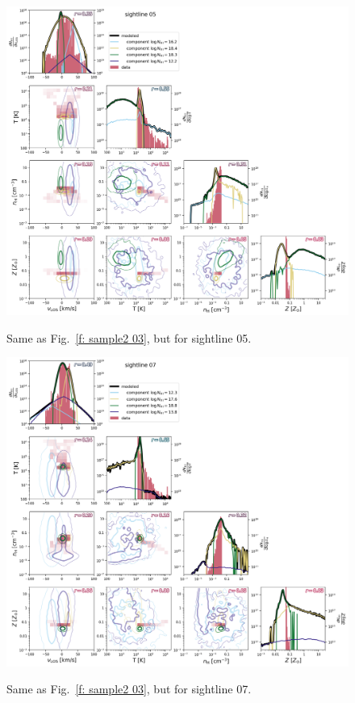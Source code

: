 \documentclass[fleqn,usenatbib]{mnras}
\begin{document}
\begin{figure}
    \centering
    \includegraphics[width=\textwidth]{figures/sample2/sightline_0005.png}
    \label{f: sample2 05}
    \caption{Same as Fig.~\ref{f: sample2 03}, but for sightline 05.}
\end{figure}

\begin{figure}
    \centering
    \includegraphics[width=\textwidth]{figures/sample2/sightline_0007.png}
    \label{f: sample2 07}
    \caption{Same as Fig.~\ref{f: sample2 03}, but for sightline 07.}
\end{figure}
\end{document}
